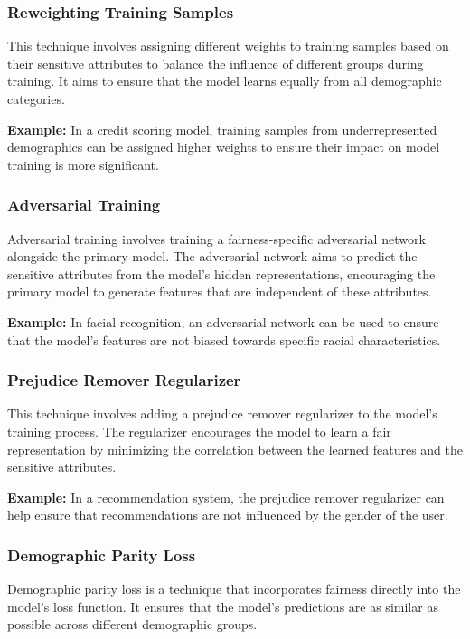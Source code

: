 \documentclass[12pt,a4paper,openright,twoside]{book}
\begin{document}
\subsubsection{Reweighting Training Samples}
This technique involves assigning different weights to training samples based on their sensitive attributes to balance the influence of different groups during training. It aims to ensure that the model learns equally from all demographic categories.

\textbf{Example:} In a credit scoring model, training samples from underrepresented demographics can be assigned higher weights to ensure their impact on model training is more significant.

\subsubsection{Adversarial Training}
Adversarial training involves training a fairness-specific adversarial network alongside the primary model. The adversarial network aims to predict the sensitive attributes from the model's hidden representations, encouraging the primary model to generate features that are independent of these attributes.

\textbf{Example:} In facial recognition, an adversarial network can be used to ensure that the model's features are not biased towards specific racial characteristics.

\subsubsection{Prejudice Remover Regularizer}
This technique involves adding a prejudice remover regularizer to the model's training process. The regularizer encourages the model to learn a fair representation by minimizing the correlation between the learned features and the sensitive attributes.

\textbf{Example:} In a recommendation system, the prejudice remover regularizer can help ensure that recommendations are not influenced by the gender of the user.

\subsubsection{Demographic Parity Loss}
Demographic parity loss is a technique that incorporates fairness directly into the model's loss function. It ensures that the model's predictions are as similar as possible across different demographic groups.
\end{document}
